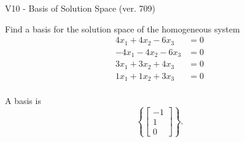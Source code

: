 \begin{exercise}
  \begin{exerciseTitle}V10 - Basis of Solution Space (ver. 709)\end{exerciseTitle}
  \begin{exerciseStatement}
    Find a basis for the solution space of the homogeneous system 
\begin{align*}
 4 x_ 1 + 4 x_ 2 -6 x_ 3 &= 0  \\ 
  -4 x_ 1 -4 x_ 2 -6 x_ 3 &= 0  \\ 
  3 x_ 1 + 3 x_ 2 + 4 x_ 3 &= 0  \\ 
  1 x_ 1 + 1 x_ 2 + 3 x_ 3 &= 0  \\ 
 \end{align*}


 
  \end{exerciseStatement}

  \begin{exerciseAnswer}
   A basis is   
\[\left\{\left[\begin{array}{c}
-1 \\
1 \\
0
\end{array}\right]\right\}.\]

  


  \end{exerciseAnswer}
\end{exercise}